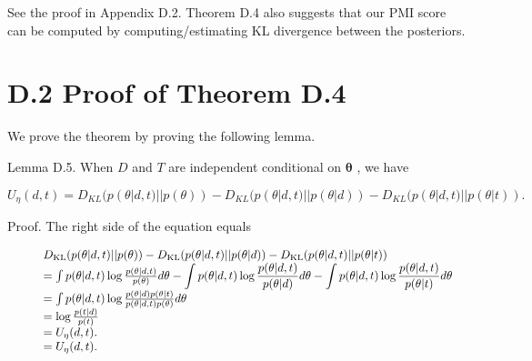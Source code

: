 See the proof in Appendix D.2. Theorem D.4 also suggests that our PMI
score can be computed by computing/estimating KL divergence between the
posteriors.

\section{D.2 Proof of Theorem D.4}\label{d.2-proof-of-theorem-d.4}

We prove the theorem by proving the following lemma.

Lemma D.5. When \(D\) and \(T\) are independent conditional on
\(\pmb \theta\) , we have

\[
U _ { \eta } ( d , t ) = D _ { K L } ( p ( \theta | d , t ) | | p ( \theta ) ) - D _ { K L } ( p ( \theta | d , t ) | | p ( \theta | d ) ) - D _ { K L } ( p ( \theta | d , t ) | | p ( \theta | t ) ) .
\]

Proof. The right side of the equation equals

\[
\begin{array} { r l } & { \begin{array} { r l } & { D _ { \mathrm { K L } } ( p ( \theta | d , t ) | | p ( \theta ) ) - D _ { \mathrm { K L } } ( p ( \theta | d , t ) | | p ( \theta | d ) ) - D _ { \mathrm { K L } } ( p ( \theta | d , t ) | | p ( \theta | t ) ) } \\ & { = \int p ( \theta | d , t ) \log \frac { p ( \theta | d , t ) } { p ( \theta ) } d \theta - \displaystyle \int p ( \theta | d , t ) \log \frac { p ( \theta | d , t ) } { p ( \theta | d ) } d \theta - \displaystyle \int p ( \theta | d , t ) \log \frac { p ( \theta | d , t ) } { p ( \theta | t ) } d \theta } \end{array} } \\ & { \begin{array} { r l } & { = \int p ( \theta | d , t ) \log \frac { p ( \theta | d ) p ( \theta | t ) } { p ( \theta | d , t ) p ( \theta ) } d \theta } \\ & { = \log \frac { p ( t | d ) } { p ( t ) } } \end{array} } \\ & { \begin{array} { r l } & { = U _ { \eta } ( d , t ) . } \end{array} } \\ & { \begin{array} { r l } & { = U _ { \eta } ( d , t ) . } \end{array} } \end{array}
\]


